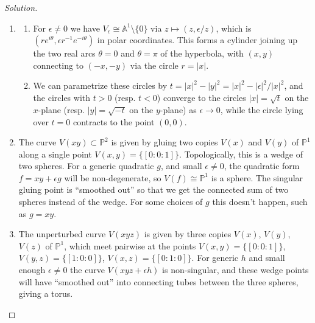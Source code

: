 \documentclass{article}
\theoremstyle{definition}
\renewcommand{\P}{\mathbb{P}}
\newcommand{\A}{\mathbb{A}}
\begin{document}
\begin{enumerate}
        \begin{proof}[Solution]
            \begin{enumerate}[label=(\alph*)]
                \item
                    \begin{enumerate}[label=(\roman*)]
                        \item For $\epsilon\ne0$ we have
                            $V_\epsilon\cong\A^1\setminus\{0\}$ via
                            $z\mapsto(z,\epsilon/z)$, which is
                            $(re^{i\theta},\epsilon r^{-1}e^{-i\theta})$ in
                            polar coordinates. This forms a cylinder joining up
                            the two real arcs $\theta=0$ and $\theta=\pi$ of the
                            hyperbola, with $(x,y)$ connecting to $(-x,-y)$ via
                            the circle $r=|x|$.

                        \item We can parametrize these circles by
                            $t=|x|^2-|y|^2=|x|^2-|\epsilon|^2/|x|^2$, and the
                            circles with $t>0$ (resp. $t<0$) converge to the
                            circles $|x|=\sqrt t$ on the $x$-plane (resp.
                            $|y|=\sqrt{-t}$ on the $y$-plane) as $\epsilon\to0$,
                            while the circle lying over $t=0$ contracts to the
                            point $(0,0)$.
                    \end{enumerate}

                \item The curve $V(xy)\subset\P^2$ is given by gluing two copies
                    $V(x)$ and $V(y)$ of $\P^1$ along a single point
                    $V(x,y)=\{[0:0:1]\}$. Topologically, this is a wedge of two
                    spheres. For a generic quadratic $g$, and small
                    $\epsilon\ne0$, the quadratic form $f=xy+\epsilon g$ will be
                    non-degenerate, so $V(f)\cong\P^1$ is a sphere. The singular
                    gluing point is ``smoothed out'' so that we get the
                    connected sum of two spheres instead of the wedge. For some
                    choices of $g$ this doesn't happen, such as $g=xy$.

                \item The unperturbed curve $V(xyz)$ is given by three copies
                    $V(x)$, $V(y)$, $V(z)$ of $\P^1$, which meet pairwise at the
                    points $V(x,y)=\{[0:0:1]\}$, $V(y,z)=\{[1:0:0]\}$,
                    $V(x,z)=\{[0:1:0]\}$. For generic $h$ and small enough
                    $\epsilon\ne0$ the curve $V(xyz+\epsilon h)$ is
                    non-singular, and these wedge points will have ``smoothed
                    out'' into connecting tubes between the three spheres,
                    giving a torus.
            \end{enumerate}
        \end{proof}
\end{enumerate}
\end{document}
